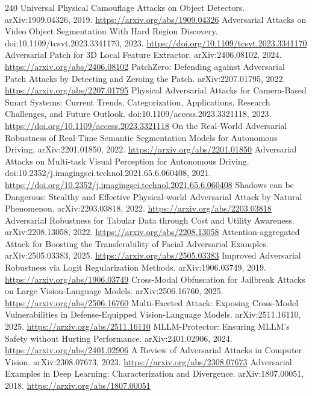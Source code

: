 \documentclass[11pt]{article}
\begin{document}
\begin{thebibliography}{240}
 Universal Physical Camouflage Attacks on Object Detectors. arXiv:1909.04326, 2019. \url{https://arxiv.org/abs/1909.04326}
 Adversarial Attacks on Video Object Segmentation With Hard Region Discovery. doi:10.1109/tcsvt.2023.3341170, 2023. \url{https://doi.org/10.1109/tcsvt.2023.3341170}
 Adversarial Patch for 3D Local Feature Extractor. arXiv:2406.08102, 2024. \url{https://arxiv.org/abs/2406.08102}
 PatchZero: Defending against Adversarial Patch Attacks by Detecting and Zeroing the Patch. arXiv:2207.01795, 2022. \url{https://arxiv.org/abs/2207.01795}
 Physical Adversarial Attacks for Camera-Based Smart Systems: Current Trends, Categorization, Applications, Research Challenges, and Future Outlook. doi:10.1109/access.2023.3321118, 2023. \url{https://doi.org/10.1109/access.2023.3321118}
 On the Real-World Adversarial Robustness of Real-Time Semantic Segmentation Models for Autonomous Driving. arXiv:2201.01850, 2022. \url{https://arxiv.org/abs/2201.01850}
 Adversarial Attacks on Multi-task Visual Perception for Autonomous Driving. doi:10.2352/j.imagingsci.technol.2021.65.6.060408, 2021. \url{https://doi.org/10.2352/j.imagingsci.technol.2021.65.6.060408}
 Shadows can be Dangerous: Stealthy and Effective Physical-world Adversarial Attack by Natural Phenomenon. arXiv:2203.03818, 2022. \url{https://arxiv.org/abs/2203.03818}
 Adversarial Robustness for Tabular Data through Cost and Utility Awareness. arXiv:2208.13058, 2022. \url{https://arxiv.org/abs/2208.13058}
 Attention-aggregated Attack for Boosting the Transferability of Facial Adversarial Examples. arXiv:2505.03383, 2025. \url{https://arxiv.org/abs/2505.03383}
 Improved Adversarial Robustness via Logit Regularization Methods. arXiv:1906.03749, 2019. \url{https://arxiv.org/abs/1906.03749}
 Cross-Modal Obfuscation for Jailbreak Attacks on Large Vision-Language Models. arXiv:2506.16760, 2025. \url{https://arxiv.org/abs/2506.16760}
 Multi-Faceted Attack: Exposing Cross-Model Vulnerabilities in Defense-Equipped Vision-Language Models. arXiv:2511.16110, 2025. \url{https://arxiv.org/abs/2511.16110}
 MLLM-Protector: Ensuring MLLM’s Safety without Hurting Performance. arXiv:2401.02906, 2024. \url{https://arxiv.org/abs/2401.02906}
 A Review of Adversarial Attacks in Computer Vision. arXiv:2308.07673, 2023. \url{https://arxiv.org/abs/2308.07673}
 Adversarial Examples in Deep Learning: Characterization and Divergence. arXiv:1807.00051, 2018. \url{https://arxiv.org/abs/1807.00051}

\end{thebibliography}
\end{document}

